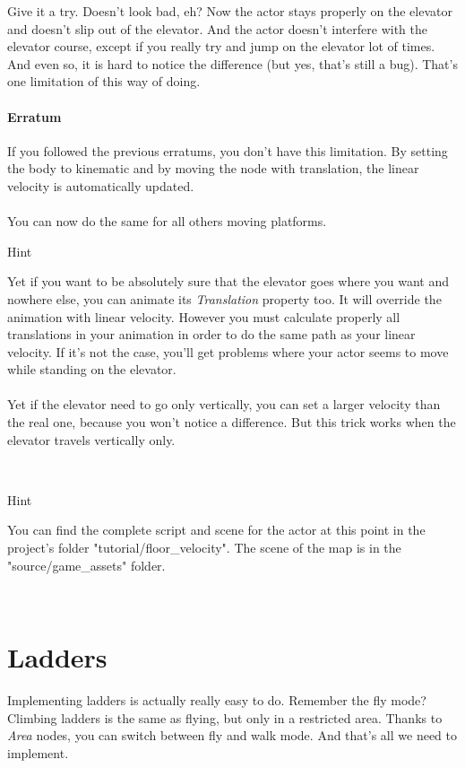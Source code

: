 \documentclass[10pt,a4paper]{article}
\newenvironment{hint}{%
\begin{bclogo}[logo=\bcinfo, couleurBarre=Green, noborder=true, 
               couleur=white]{Hint}
}{%
\end{bclogo}\hspace{1px}\\
}
\begin{document}
Give it a try. Doesn't look bad, eh? Now the actor stays properly on the elevator and doesn't slip out of the elevator. And the actor doesn't interfere with the elevator course, except if you really try and jump on the elevator lot of times. And even so, it is hard to notice the difference (but yes, that's still a bug). That's one limitation of this way of doing. 
\paragraph{Erratum}
If you followed the previous erratums, you don't have this limitation. By setting the body to kinematic and by moving the node with translation, the linear velocity is automatically updated.\\
\\
You can now do the same for all others moving platforms.

\begin{hint}
Yet if you want to be absolutely sure that the elevator goes where you want and nowhere else, you can animate its \textit{Translation} property too. It will override the animation with linear velocity. However you must calculate properly all translations in your animation in order to do the same path as your linear velocity. If it's not the case, you'll get problems where your actor seems to move while standing on the elevator. \\
\\
Yet if the elevator need to go only vertically, you can set a larger velocity than the real one, because you won't notice a difference. But this trick works when the elevator travels vertically only.
\end{hint}

\begin{hint}
You can find the complete script and scene for the actor at this point in the project's folder "tutorial/floor\_velocity". The scene of the map is in the "source/game\_assets" folder.
\end{hint}

\section{Ladders}
Implementing ladders is actually really easy to do. Remember the fly mode? Climbing ladders is the same as flying, but only in a restricted area. Thanks to \textit{Area} nodes, you can switch between fly and walk mode. And that's all we need to implement.
\end{document}
